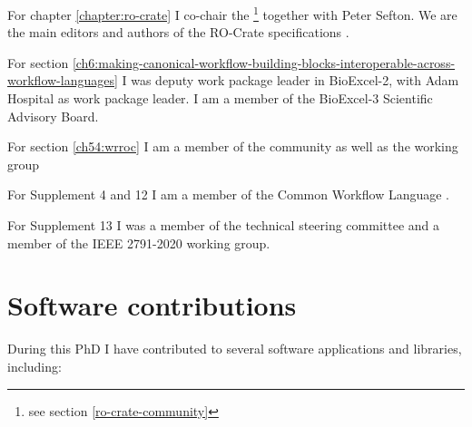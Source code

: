 For chapter \ref{chapter:ro-crate} I co-chair the \footnote{see section \vref{ro-crate-community}} together with Peter Sefton. We are the main editors and authors of the RO-Crate specifications \cite{ch5-105,ch5-107,rocrate1.1}.

For section \ref{ch6:making-canonical-workflow-building-blocks-interoperable-across-workflow-languages} I was deputy work package leader in BioExcel-2, with Adam
Hospital as work package leader. I am a member of the BioExcel-3 Scientific Advisory Board.

For section \ref{ch54:wrroc} I am a member of the  community as well as the 
 working group 

For Supplement 4 \cite{Crusoe 2022} and 12 \cite{Khan 2019} I am a member of the Common Workflow Language .

For Supplement 13 \cite{ieee2791} I was a member of the
 technical
steering committee and a member of the IEEE 2791-2020 working
group.



\section{Software contributions}

During this PhD I have contributed to several software applications and libraries, including:

